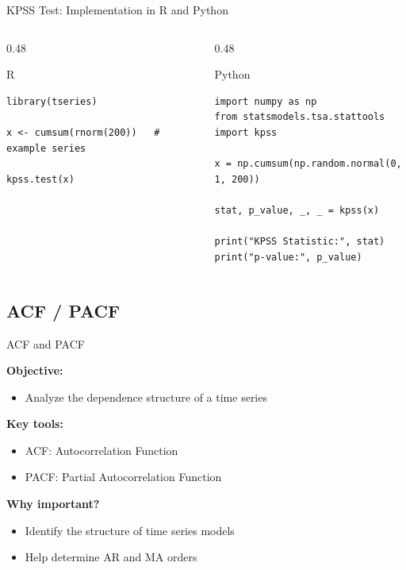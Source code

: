 \documentclass[aspectratio=169]{beamer}
\begin{document}
\begin{frame}[fragile]{KPSS Test: Implementation in R and Python}
\small

\begin{columns}[T]
\begin{column}{0.48\textwidth}
\begin{block}{R}
\begin{verbatim}
library(tseries)

x <- cumsum(rnorm(200))   # example series

kpss.test(x)
\end{verbatim}
\end{block}
\end{column}

\begin{column}{0.48\textwidth}
\begin{block}{Python}
\begin{verbatim}
import numpy as np
from statsmodels.tsa.stattools import kpss

x = np.cumsum(np.random.normal(0, 1, 200))

stat, p_value, _, _ = kpss(x)

print("KPSS Statistic:", stat)
print("p-value:", p_value)
\end{verbatim}
\end{block}
\end{column}
\end{columns}

\end{frame}

\subsection{ACF / PACF}

\begin{frame}{ACF and PACF}

\textbf{Objective:}
\begin{itemize}
    \item Analyze the dependence structure of a time series
\end{itemize}

\vspace{0.4cm}

\textbf{Key tools:}
\begin{itemize}
    \item ACF: Autocorrelation Function
    \item PACF: Partial Autocorrelation Function
\end{itemize}

\vspace{0.4cm}

\textbf{Why important?}
\begin{itemize}
    \item Identify the structure of time series models
    \item Help determine AR and MA orders
\end{itemize}

\end{frame}
\end{document}
